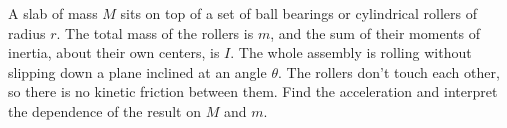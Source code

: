 A slab of mass $M$ sits on top of a set of ball bearings or cylindrical rollers
of radius $r$.
The total mass of the rollers is $m$, and the sum of their moments of inertia,
about their own centers, is $I$. The whole assembly is rolling without slipping down a plane
inclined at an angle $\theta$. The rollers don't touch each other, so there
is no kinetic friction between them. Find the acceleration and interpret 
the dependence of the result on $M$ and $m$.
\answercheck
